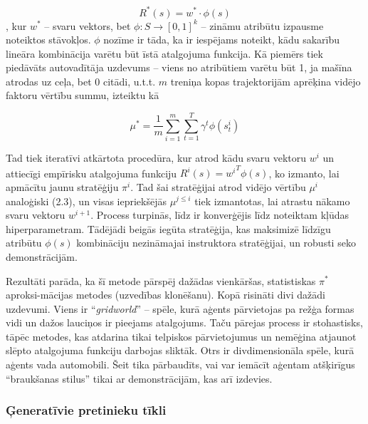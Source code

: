 \documentclass[12pt, a4paper]{article}
\numberwithin{equation}{section} %
\begin{document}
\begin{equation}
    R^*(s) = w^* \cdot \phi(s)
\end{equation}
, kur $w^*$ -- svaru vektors, bet $\phi: S \rightarrow [0,1]^k$ -- zināmu atribūtu izpausme noteiktos stāvokļos. $\phi$ nozīme ir tāda, ka ir iespējams noteikt, kādu sakarību lineāra kombinācija varētu būt īstā atalgojuma funkcija. Kā piemērs tiek piedāvāts autovadītāja uzdevums -- viens no atribūtiem varētu būt 1, ja mašīna atrodas uz ceļa, bet 0 citādi, u.t.t. $m$ treniņa kopas trajektorijām aprēķina vidējo faktoru vērtību summu, izteiktu kā

\begin{equation}
    \mu^* = \frac{1}{m}\sum_{i=1}^m\sum_{t=1}^T \gamma^t \phi(s^i_t)
\end{equation}

Tad tiek iteratīvi atkārtota procedūra, kur atrod kādu svaru vektoru $w^{i}$ un attiecīgi empīrisku atalgojuma funkciju $R^{i}(s) = {w^{i}}^T\phi(s)$, ko izmanto, lai apmācītu jaunu stratēģiju $\pi^i$. Tad šai stratēģijai atrod vidējo vērtību $\mu^i$ analoģiski (2.3), un visas iepriekšējās $\mu^{j \leq i}$ tiek izmantotas, lai atrastu nākamo svaru vektoru $w^{i+1}$. Process turpinās, līdz ir konverģējis līdz noteiktam kļūdas hiperparametram. Tādējādi beigās iegūta stratēģija, kas maksimizē līdzīgu atribūtu $\phi(s)$ kombināciju nezināmajai instruktora stratēģijai, un robusti seko demonstrācijām.

Rezultāti parāda, ka šī metode pārspēj dažādas vienkāršas, statistiskas $\pi^*$ aproksi-mācijas metodes (uzvedības klonēšanu). Kopā risināti divi dažādi uzdevumi. Viens ir ``\textit{gridworld}'' -- spēle, kurā aģents pārvietojas pa režģa formas vidi un dažos lauciņos ir pieejams atalgojums. Taču pārejas process ir stohastisks, tāpēc metodes, kas atdarina tikai telpiskos pārvietojumus un nemēģina atjaunot slēpto atalgojuma funkciju darbojas sliktāk. Otrs ir divdimensionāla spēle, kurā aģents vada automobili. Šeit tika pārbaudīts, vai var iemācīt aģentam atšķirīgus ``braukšanas stilus'' tikai ar demonstrācijām, kas arī izdevies.

\subsubsection{Ģeneratīvie pretinieku tīkli}
\end{document}
